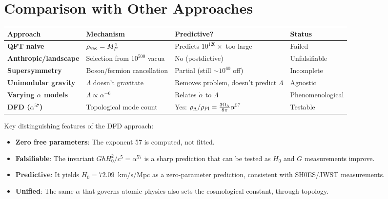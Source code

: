 \documentclass[11pt]{article}
\begin{document}
\section{Comparison with Other Approaches}

\begin{center}
\begin{tabular}{p{3.5cm}p{3cm}p{3cm}p{3cm}}
\toprule
\textbf{Approach} & \textbf{Mechanism} & \textbf{Predictive?} & \textbf{Status} \\
\midrule
\textbf{QFT naive} & $\rho_{\rm vac} = M_P^4$ & Predicts $10^{120}\times$ too large & Failed \\
\textbf{Anthropic/landscape} & Selection from $10^{500}$ vacua & No (postdictive) & Unfalsifiable \\
\textbf{Supersymmetry} & Boson/fermion cancellation & Partial (still $\sim 10^{60}$ off) & Incomplete \\
\textbf{Unimodular gravity} & $\Lambda$ doesn't gravitate & Removes problem, doesn't predict $\Lambda$ & Agnostic \\
\textbf{Varying $\alpha$ models} & $\Lambda \propto \alpha^{-6}$ & Relates $\dot\alpha$ to $\dot\Lambda$ & Phenomenological \\
\textbf{DFD ($\alpha^{57}$)} & Topological mode count & Yes: $\rho_\Lambda/\rho_{\rm Pl} = \frac{3\Omega_\Lambda}{8\pi}\alpha^{57}$ & Testable \\
\bottomrule
\end{tabular}
\end{center}

Key distinguishing features of the DFD approach:
\begin{itemize}
\item \textbf{Zero free parameters}: The exponent 57 is computed, not fitted.
\item \textbf{Falsifiable}: The invariant $G\hbar H_0^2/c^5 = \alpha^{57}$ is a sharp prediction
that can be tested as $H_0$ and $G$ measurements improve.
\item \textbf{Predictive}: It yields $H_0 = 72.09$~km/s/Mpc as a zero-parameter prediction,
consistent with SH0ES/JWST measurements.
\item \textbf{Unified}: The same $\alpha$ that governs atomic physics also sets the
cosmological constant, through topology.
\end{itemize}
\end{document}
